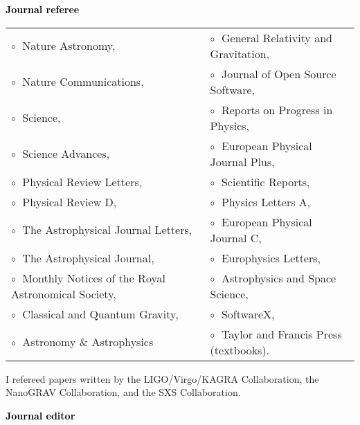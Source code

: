 \textbf{\textcolor{black}{Journal referee}}\vspace{0.1cm}\\
\begin{tabular}{@{\hskip 0.4cm}l@{\hskip 0.4in}l}
$\circ\;$ Nature Astronomy,  & $\circ\;$   General Relativity and Gravitation, \\
$\circ\;$ Nature Communications,  & $\circ\;$ Journal of Open Source Software,     \\
$\circ\;$ Science, & $\circ\;$ Reports on Progress in Physics,  \\
$\circ\;$ Science Advances, & $\circ\;$  European Physical Journal Plus, \\
$\circ\;$ Physical Review Letters, & $\circ\;$ Scientific Reports, \\
$\circ\;$ Physical Review D,  & $\circ\;$ Physics Letters A,  \\
$\circ\;$  The Astrophysical Journal Letters,  &  $\circ\;$  European Physical Journal C, \\
$\circ\;$ The Astrophysical Journal,  &  $\circ\;$ Europhysics Letters, \\
$\circ\;$  Monthly Notices of the Royal Astronomical Society, & $\circ\;$ Astrophysics and Space Science, \\
$\circ\;$  Classical and Quantum Gravity, & $\circ\;$ SoftwareX, \\
$\circ\;$  Astronomy \& Astrophysics & $\circ\;$ Taylor and Francis Press (textbooks). \\
\end{tabular}

\vspace{0.2cm}

I refereed papers written by the LIGO/Virgo/KAGRA Collaboration, the NanoGRAV Collaboration, and the SXS Collaboration.


\vspace{0.2cm}




 \textbf{\textcolor{black}{Journal editor}}\vspace{0.1cm}\\
 \vspace{-0.1cm}
\vspace{0.2cm}


